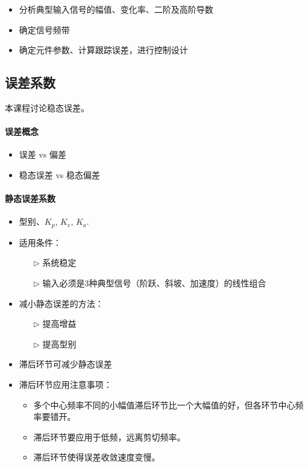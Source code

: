 \documentclass[14pt,a4paper]{article}
\theoremstyle{plain}
\theoremstyle{definition}
\theoremstyle{remark}
\theoremstyle{plain}
\theoremstyle{plain}
\theoremstyle{definition}
\begin{document}
			\begin{itemize}
				\item 分析典型输入信号的幅值、变化率、二阶及高阶导数 
				\item 确定信号频带
				\item 确定元件参数、计算跟踪误差，进行控制设计
			\end{itemize}
		
		\subsection{误差系数}%
		\label{sub:误差系数}

			本课程讨论稳态误差。
			\paragraph{误差概念}%
			\label{par:误差概念}
			
			\begin{itemize}
				\item 误差 vs 偏差
				\item 稳态误差 vs 稳态偏差
			\end{itemize}

			\paragraph{静态误差系数}%
			\label{par:静态误差系数}
			\begin{itemize}
				\item 型别、$K_p$, $K_v$, $K_a$. 
				\item 适用条件：
					\begin{itemize}
						\item[$\triangleright$] 系统稳定
						\item[$\triangleright$] 输入必须是3种典型信号（阶跃、斜坡、加速度）的线性组合
					\end{itemize}  
				\item 减小静态误差的方法：
					\begin{itemize}
						\item[$\triangleright$] 提高增益 
						\item[$\triangleright$] 提高型别 
					\end{itemize}  
			\end{itemize}

			\begin{itemize}
				\item 滞后环节可减少静态误差
				\item 滞后环节应用注意事项：
					\begin{itemize}
						\item 多个中心频率不同的小幅值滞后环节比一个大幅值的好，但各环节中心频率要错开。
						\item 滞后环节要应用于低频，远离剪切频率。
						\item 滞后环节使得误差收敛速度变慢。
					\end{itemize}
			\end{itemize}
\end{document}
